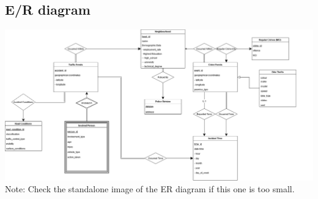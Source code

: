 \documentclass[12pt, a4paper]{article}
\begin{document}
\subsection*{E/R diagram}
\color{black}
\includegraphics[scale=0.3]{ER Diagram.png}
Note: Check the standalone image of the ER diagram if this one is too small.
\end{document}

